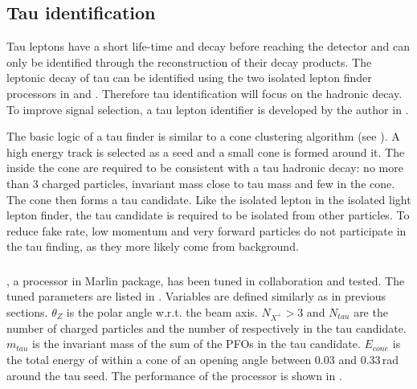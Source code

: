 \subsection{Tau identification}

Tau leptons have a short life-time and decay before reaching the detector and can only be identified through the reconstruction of their decay products. The leptonic decay of tau can be identified using the two isolated lepton finder processors in  and  . Therefore tau identification will focus on the hadronic decay. To improve signal selection, a tau lepton identifier is developed by the author in .

The basic logic of a tau finder is similar to a cone clustering algorithm (see  ). A high energy track is selected as a seed and a small cone is formed around it. The \PFOs inside the cone are required to be consistent with a tau hadronic decay: no more than 3 charged particles, invariant mass close to tau mass and few \PFOs in the cone. The cone then forms a tau candidate. Like the isolated lepton in the isolated light lepton finder, the tau candidate is required to be isolated from other particles. To reduce fake rate, low momentum and very forward particles do not participate in the tau finding, as they more likely come from \ggHad background.



\subsubsection{\TauFinderProcessor}


\TauFinderProcessor \cite{LCD-Note-2010-009}, a processor in Marlin package, has been tuned in collaboration and tested. The tuned parameters are listed in . Variables are defined similarly as in previous sections. $\theta_Z$ is the polar angle w.r.t. the beam axis. $N_{X^+} > 3$ and $N_{tau}$ are the number of charged particles and the number of \PFOs respectively in the tau candidate. $m_{tau}$ is the invariant mass of the sum of the PFOs in the tau candidate. $E_{cone}$ is the total energy of \PFOs within a cone of an opening angle between 0.03 and 0.33\,rad  around the tau seed. The performance of the processor is shown in .

